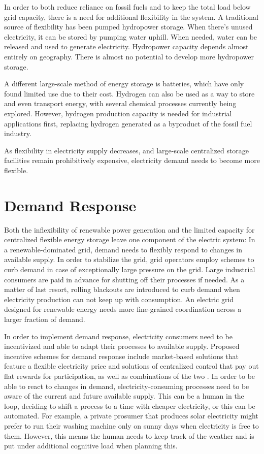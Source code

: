 In order to both reduce reliance on fossil fuels and to keep the total load below grid capacity, there is a need for additional flexibility in the system.
A traditional source of flexibility has been pumped hydropower storage.
When there's unused electricity, it can be stored by pumping water uphill.
When needed, water can be released and used to generate electricity. 
Hydropower capacity depends almost entirely on geography.
There is almost no potential to develop more hydropower storage.

A different large-scale method of energy storage is batteries, which have only found limited use due to their cost.
Hydrogen can also be used as a way to store and even transport energy, with several chemical processes currently being explored.
However, hydrogen production capacity is needed for industrial applications first, replacing hydrogen generated as a byproduct of the fossil fuel industry.

As flexibility in electricity supply decreases, and large-scale centralized storage facilities remain prohibitively expensive, electricity demand needs to become more flexible.

\section{Demand Response}
Both the inflexibility of renewable power generation and the limited capacity for centralized flexible energy storage leave one component of the electric system: In a renewable-dominated grid, demand needs to flexibly respond to changes in available supply.
In order to stabilize the grid, grid operators employ schemes to curb demand in case of exceptionally large pressure on the grid.
Large industrial consumers are paid in advance for shutting off their processes if needed.
As a matter of last resort, rolling blackouts are introduced to curb demand when electricity production can not keep up with consumption.
An electric grid designed for renewable energy needs more fine-grained coordination across a larger fraction of demand.

In order to implement demand response, electricity consumers need to be incentivized and able to adapt their processes to available supply.
Proposed incentive schemes for demand response include market-based solutions that feature a flexible electricity price and solutions of centralized control that pay out flat rewards for participation, as well as combinations of the two \citep{khajavi2011RoleIncentiveBased}.
In order to be able to react to changes in demand, electricity-consuming processes need to be aware of the current and future available supply.
This can be a human in the loop, deciding to shift a process to a time with cheaper electricity, or this can be automated.
For example, a private prosumer that produces solar electricity might prefer to run their washing machine only on sunny days when electricity is free to them.
However, this means the human needs to keep track of the weather and is put under additional cognitive load when planning this.

